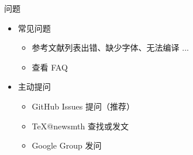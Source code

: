 
\begin{frame}{\ThuThesis 问题}
    \begin{itemize}
      \item 常见问题
        \begin{itemize}
          \item 参考文献列表出错、缺少字体、无法编译 ...
          \item 查看 FAQ 
        \end{itemize}
      \item 主动提问
        \begin{itemize}
          \item GitHub Issues 提问（推荐）
          \item \TeX @newsmth 查找或发文
          \item \ThuThesis{} Google Group 发问 
        \end{itemize}
    \end{itemize}
\end{frame}



